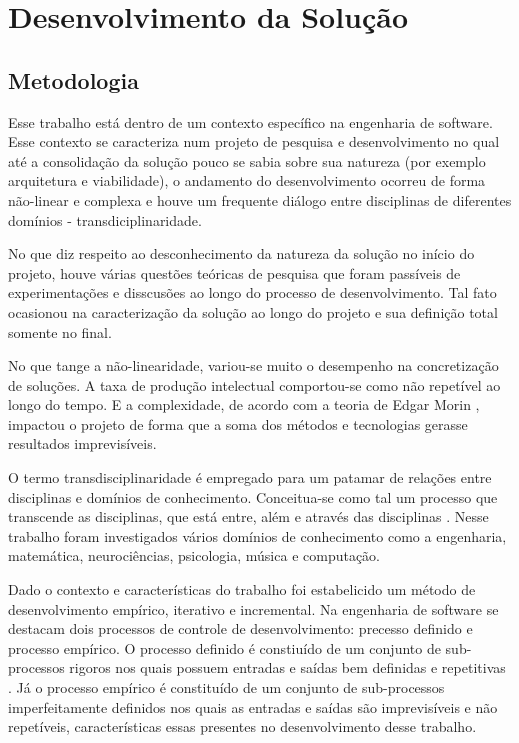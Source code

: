 \chapter{Desenvolvimento da Solução}
\label{chap:solucaocompleta}

\section{Metodologia}

Esse trabalho está dentro de um contexto específico na engenharia de software. Esse contexto se caracteriza num projeto de pesquisa e desenvolvimento no qual até a consolidação da solução pouco se sabia sobre sua natureza (por exemplo arquitetura e viabilidade), o andamento do desenvolvimento ocorreu de forma não-linear e complexa e houve um frequente diálogo entre disciplinas de diferentes domínios - transdiciplinaridade.

No que diz respeito ao desconhecimento da natureza da solução no início do projeto, houve várias questões teóricas de pesquisa que foram passíveis de experimentações e disscusões ao longo do processo de desenvolvimento. Tal fato ocasionou na caracterização da solução ao longo do projeto e sua definição total somente no final.

No que tange a não-linearidade, variou-se muito o desempenho na concretização de soluções. A taxa de produção intelectual comportou-se como não repetível ao longo do tempo. E a complexidade, de acordo com a teoria de Edgar Morin \cite{morin}, impactou o projeto de forma que a soma dos métodos e tecnologias gerasse resultados imprevisíveis.

O termo transdisciplinaridade é empregado para um patamar de relações entre disciplinas e domínios de conhecimento. Conceitua-se como tal um processo que transcende as disciplinas, que está entre, além e através das disciplinas \cite{criatividade}. Nesse trabalho foram investigados vários domínios de conhecimento como a engenharia, matemática, neurociências, psicologia, música e computação.

Dado o contexto e características do trabalho foi estabelicido um método de desenvolvimento empírico, iterativo e incremental. Na engenharia de software se destacam dois processos de controle de desenvolvimento: precesso definido e processo empírico. O processo definido é constiuído de um conjunto de sub-processos rigoros nos quais possuem entradas e saídas bem definidas e repetitivas \cite{rup}. Já o processo empírico é constituído de um conjunto de sub-processos imperfeitamente definidos nos quais as entradas e saídas são imprevisíveis e não repetíveis, características essas presentes no desenvolvimento desse trabalho.

